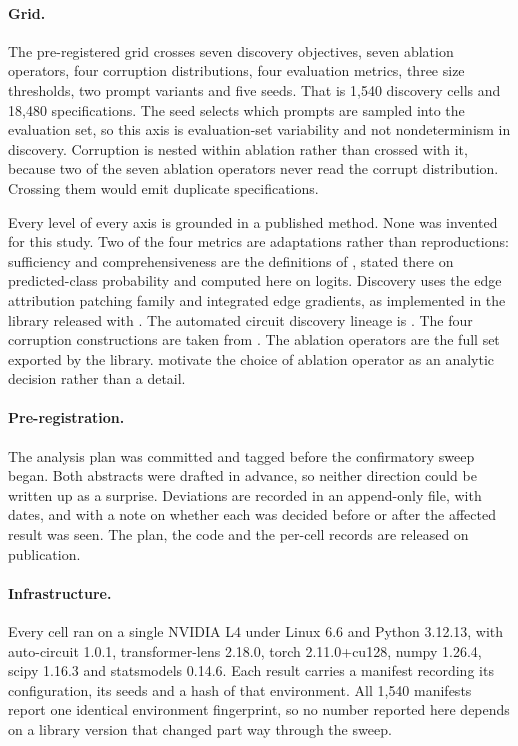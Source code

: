 \documentclass[letterpaper]{article} %
\begin{document}
\paragraph{Grid.}
The pre-registered grid crosses seven discovery objectives, seven ablation
operators, four corruption distributions, four evaluation metrics, three size
thresholds, two prompt variants and five seeds. That is 1{,}540 discovery cells
and 18{,}480 specifications. The seed selects which prompts are sampled into the
evaluation set, so this axis is evaluation-set variability and not
nondeterminism in discovery. Corruption is nested within ablation rather than
crossed with it, because two of the seven ablation operators never read the
corrupt distribution. Crossing them would emit duplicate specifications.

Every level of every axis is grounded in a published method. None was invented
for this study. Two of the four metrics are adaptations rather than
reproductions: sufficiency and comprehensiveness are the definitions of
\citet{deyoung2020}, stated there on predicted-class probability and computed
here on logits. Discovery uses the edge attribution patching family
\citep{syed2023} and integrated edge gradients, as implemented in the library
released with \citet{miller2024}. The automated circuit discovery lineage is
\citet{conmy2023}. The four corruption constructions are taken from
\citet{wang2022}. The ablation operators are the full set exported by the
library. \citet{li2024} motivate the choice of ablation operator as an analytic
decision rather than a detail.

\paragraph{Pre-registration.}
The analysis plan was committed and tagged before the confirmatory sweep began.
Both abstracts were drafted in advance, so neither direction could be written up
as a surprise. Deviations are recorded in an append-only file, with dates, and
with a note on whether each was decided before or after the affected result was
seen. The plan, the code and the per-cell records are released on publication.

\paragraph{Infrastructure.} Every cell ran on a single NVIDIA L4 under Linux
6.6 and Python 3.12.13, with auto-circuit 1.0.1, transformer-lens 2.18.0, torch
2.11.0+cu128, numpy 1.26.4, scipy 1.16.3 and statsmodels 0.14.6. Each result
carries a manifest recording its configuration, its seeds and a hash of that
environment. All 1{,}540 manifests report one identical environment
fingerprint, so no number reported here depends on a library version that
changed part way through the sweep.
\end{document}
